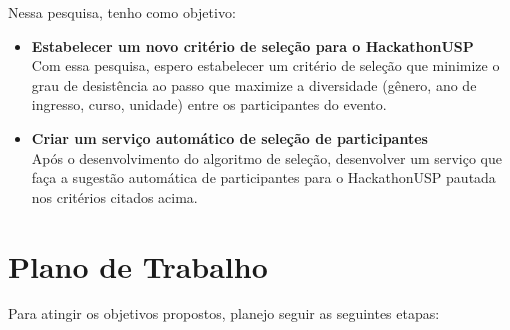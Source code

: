 \documentclass[10pt,twoside,a4paper]{article}
\begin{document}
    Nessa pesquisa, tenho como objetivo:
    \begin{itemize}
      \item \textbf{Estabelecer um novo critério de seleção para o  HackathonUSP}\\
        Com essa pesquisa, espero estabelecer um critério de seleção que minimize o grau de desistência ao passo que maximize a diversidade (gênero, ano de ingresso, curso, unidade) entre os participantes do evento.

      \item \textbf{Criar um serviço automático de seleção de participantes}\\
        Após o desenvolvimento do algoritmo de seleção, desenvolver um serviço que faça a sugestão automática de participantes para o HackathonUSP pautada nos critérios citados acima.
    \end{itemize}
    
\section{Plano de Trabalho}
  
  Para atingir os objetivos propostos, planejo seguir as seguintes etapas:
\end{document}
